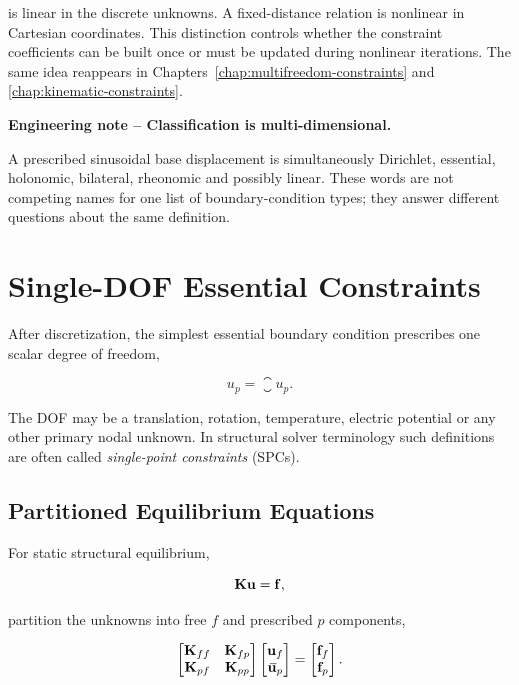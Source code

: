 is linear in the discrete unknowns. A fixed-distance relation is nonlinear in
Cartesian coordinates. This distinction controls whether the constraint
coefficients can be built once or must be updated during nonlinear iterations.
The same idea reappears in Chapters~\ref{chap:multifreedom-constraints} and
\ref{chap:kinematic-constraints}.

\begin{bbox}
\textbf{Engineering note -- Classification is multi-dimensional.}

A prescribed sinusoidal base displacement is simultaneously Dirichlet,
essential, holonomic, bilateral, rheonomic and possibly linear. These words are
not competing names for one list of boundary-condition types; they answer
different questions about the same definition.
\end{bbox}

\section{Single-DOF Essential Constraints}\label{sec:single-dof-bc}

After discretization, the simplest essential boundary condition prescribes one
scalar degree of freedom,

\begin{equation}\label{eq:single-dof-constraint}
    u_p=\closure{u}_p.
\end{equation}

The DOF may be a translation, rotation, temperature, electric potential or any
other primary nodal unknown. In structural solver terminology such definitions
are often called \textit{single-point constraints} (SPCs).

\subsection{Partitioned Equilibrium Equations}

For static structural equilibrium,

\begin{equation}
    \mathbf{K}\mathbf{u}=\mathbf{f},
\end{equation}

partition the unknowns into free $f$ and prescribed $p$ components,

\begin{equation}
    \begin{bmatrix}
        \mathbf{K}_{ff} & \mathbf{K}_{fp}\\
        \mathbf{K}_{pf} & \mathbf{K}_{pp}
    \end{bmatrix}
    \begin{bmatrix}
        \mathbf{u}_f\\
        {}\mkern3mu\overline{\mkern-3mu\mathbf{u}}_p
    \end{bmatrix}
    =
    \begin{bmatrix}
        \mathbf{f}_f\\
        \mathbf{f}_p
    \end{bmatrix}.
\end{equation}

